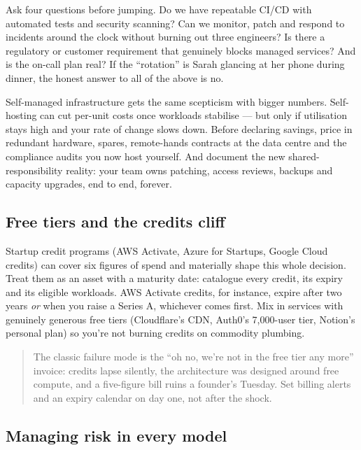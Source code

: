 Ask four questions before jumping. Do we have repeatable CI/CD with automated tests and security scanning? Can we monitor, patch and respond to incidents around the clock without burning out three engineers? Is there a regulatory or customer requirement that genuinely blocks managed services? And is the on-call plan real? If the ``rotation'' is Sarah glancing at her phone during dinner, the honest answer to all of the above is no.


Self-managed infrastructure gets the same scepticism with bigger numbers. Self-hosting can cut per-unit costs once workloads stabilise — but only if utilisation stays high and your rate of change slows down. Before declaring savings, price in redundant hardware, spares, remote-hands contracts at the data centre and the compliance audits you now host yourself. And document the new shared-responsibility reality: your team owns patching, access reviews, backups and capacity upgrades, end to end, forever.



\subsection{Free tiers and the credits cliff}


Startup credit programs (AWS Activate, Azure for Startups, Google Cloud credits) can cover six figures of spend and materially shape this whole decision. Treat them as an asset with a maturity date: catalogue every credit, its expiry and its eligible workloads. AWS Activate credits, for instance, expire after two years \emph{or} when you raise a Series A, whichever comes first. Mix in services with genuinely generous free tiers (Cloudflare's CDN, Auth0's 7,000-user tier, Notion's personal plan) so you're not burning credits on commodity plumbing.



\begin{quote}\small
The classic failure mode is the ``oh no, we're not in the free tier any more'' invoice: credits lapse silently, the architecture was designed around free compute, and a five-figure bill ruins a founder's Tuesday. Set billing alerts and an expiry calendar on day one, not after the shock.
\end{quote}



\subsection{Managing risk in every model}


